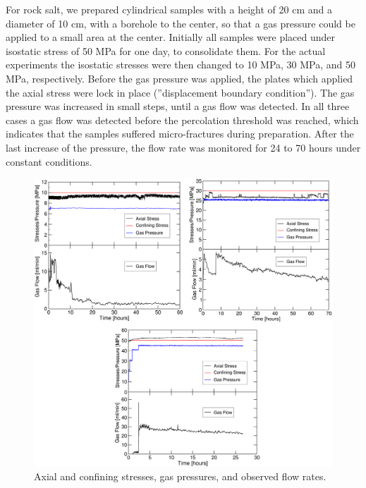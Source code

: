 For rock salt, we prepared cylindrical samples with a height of 20 cm and a diameter of 10 cm, with a borehole to the center, so that a gas pressure could be applied to a small area at the center. Initially all samples were placed under isostatic stress of 50 MPa for one day, to consolidate them. For the actual experiments the isostatic stresses were then changed to 10 MPa, 30 MPa, and 50 MPa, respectively. Before the gas pressure was applied, the plates which applied the axial stress were lock in place (''displacement boundary condition''). The gas pressure was increased in small steps, until a gas flow was detected. In all three cases a gas flow was detected before the percolation threshold was reached, which indicates that the samples suffered micro-fractures during preparation. After the last increase of the pressure, the flow rate was monitored for 24 to 70 hours under constant conditions.

\begin{figure}[!ht]
\centering
\includegraphics[width=1\textwidth]{figures/mex3-stresses-flows-v2.png}
\caption{Axial and confining stresses, gas pressures, and observed flow rates.}
\label{fig:ME3-stresses-flows}
\end{figure}
 
